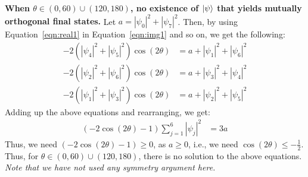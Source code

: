 \begin{prf}
\medskip
\noindent
{\bf When $\theta \in (0, 60) \cup (120, 180)$, no existence of $\ket{\psi}$ that yields mutually orthogonal final states.}
Let $a = |\psi_0|^{2} + |\psi_7|^{2}$. Then, by using Equation~\ref{eqn:real1} in
Equation~\ref{eqn:img1} and so on, we get the following:
\begin{align*}
    -2 (|\psi_4|^{2} + |\psi_5|^{2})\cos(2\theta) &= a + |\psi_1|^{2} + |\psi_6|^{2} \\
    -2 (|\psi_2|^{2} + |\psi_6|^{2})\cos(2\theta) &= a + |\psi_3|^{2} + |\psi_4|^{2} \\
    -2 (|\psi_1|^{2} + |\psi_3|^{2})\cos(2\theta) &= a + |\psi_2|^{2} + |\psi_5|^{2} 
\end{align*}
Adding up the above equations and rearranging, we get:
\begin{align*}
 (-2\cos(2\theta) - 1) \sum_{j=1}^6 |\psi_j|^{2} &= 3a
\end{align*}
Thus, we need $(-2\cos(2\theta) - 1) \geq 0$, as $a \geq 0$, i.e., we need
$\cos(2\theta) \leq -\frac{1}{2}$. 
Thus, for $\theta \in (0, 60) \cup (120, 180)$, 
there is no solution to the above equations.  {\em Note that we have not used any symmetry argument here.}
\end{prf}

